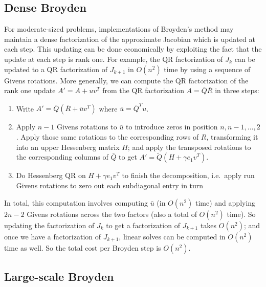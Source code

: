 \documentclass[12pt, leqno]{article} %
\begin{document}
\subsection{Dense Broyden}

For moderate-sized problems, implementations of Broyden's method
may maintain a dense factorization of the approximate Jacobian
which is updated at each step.  This updating can be done economically
by exploiting the fact that the update at each step is rank one.
For example, the QR factorization of $J_k$ can be updated to a QR
factorization of $J_{k+1}$ in $O(n^2)$ time by using a sequence of
Givens rotations.  More generally, we can compute the QR factorization
of the rank one update $A' = A + uv^T$ from the QR factorization
$A = \bar{Q} \bar{R}$ in three steps:
\begin{enumerate}
\item
  Write $A' = \bar{Q} (\bar{R} + \bar{u} v^T)$
  where $\bar{u} = \bar{Q}^T u$.
\item
  Apply $n-1$ Givens rotations to $\bar{u}$ to introduce zeros in
  position $n, n-1, \ldots, 2$.  Apply those same rotations to the
  corresponding rows of $R$, transforming it into an upper Hessenberg
  matrix $H$; and apply the transposed rotations to the corresponding
  columns of $\bar{Q}$ to get $A' = \tilde{Q} (H + \gamma e_1 v^T)$.
\item
  Do Hessenberg QR on $H + \gamma e_1 v^T$ to finish the
  decomposition, i.e.~apply run Givens rotations to zero out
  each subdiagonal entry in turn
\end{enumerate}
In total, this computation involves computing $\bar{u}$ (in $O(n^2)$
time) and applying $2n-2$ Givens rotations across the two factors
(also a total of $O(n^2)$ time).  So updating the factorization of
$J_k$ to get a factorization of $J_{k+1}$ takes $O(n^2)$; and once we
have a factorization of $J_{k+1}$, linear solves can be computed in
$O(n^2)$ time as well.  So the total cost per Broyden step is
$O(n^2)$.

\subsection{Large-scale Broyden}
\end{document}
